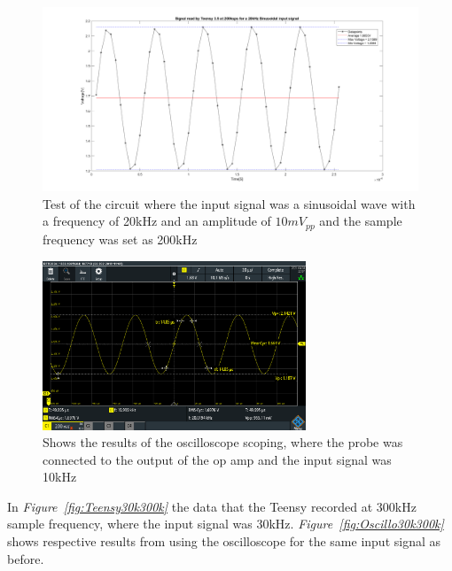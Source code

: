 \begin{figure}[h]
    \centering
    \includegraphics[width=1.0\textwidth]{graphics/20kin_200ksampl.png}
    \caption{Test of the circuit where the input signal was a sinusoidal wave with a frequency of 20kHz and an amplitude of $10mV_{pp}$ and the sample frequency was set as 200kHz}
    \label{fig:Teensy20k200k}
\end{figure}

\begin{figure}[h]
    \centering
    \includegraphics[width=0.7\textwidth]{graphics/20k10mvPP200ksamp.PNG}
    \caption{Shows the results of the oscilloscope scoping, where the probe was connected to the output of the op amp and the input signal was 10kHz}
    \label{fig:Oscillo20k200k}
\end{figure}

\vspace{4cm}



In \textit{Figure~\ref{fig:Teensy30k300k}} the data that the Teensy recorded at 300kHz sample frequency, where the input signal was 30kHz.
\textit{Figure~\ref{fig:Oscillo30k300k}} shows respective results from using the oscilloscope for the same input signal as before.


